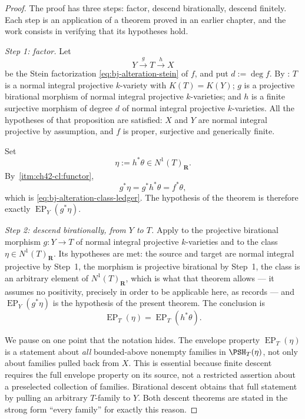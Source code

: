\begin{proof}
The proof has three steps: factor, descend birationally, descend finitely.
Each step is an application of a theorem proved in an earlier chapter, and
the work consists in verifying that its hypotheses hold.

\medskip
\noindent\emph{Step 1: factor.}
Let
\[
 Y\xrightarrow{\ g\ }T\xrightarrow{\ h\ }X
\]
be the Stein factorization \eqref{eq:bj-alteration-stein} of $f$, and put
$d:=\deg f$.  By :
$T$ is a normal integral projective $k$-variety with $K(T)=K(Y)$;
$g$ is a projective birational morphism of normal integral projective
$k$-varieties; and $h$ is a finite surjective morphism of degree $d$
of normal integral projective $k$-varieties.  All the hypotheses of that
proposition are satisfied: $X$ and $Y$ are normal integral projective by
assumption, and $f$ is proper, surjective and generically finite.

Set
\[
 \eta:=h^*\theta\in N^1(T)_{\mathbf R}.
\]
By \,\cref{itm:ch42-cl:functor},
\[
 g^*\eta=g^*h^*\theta=f^*\theta,
\]
which is \eqref{eq:bj-alteration-class-ledger}.  The hypothesis of the
theorem is therefore exactly $\operatorname{EP}_Y(g^*\eta)$.

\medskip
\noindent\emph{Step 2: descend birationally, from $Y$ to $T$.}
Apply  to the projective birational
morphism $g:Y\to T$ of normal integral projective $k$-varieties and to
the class $\eta\in N^1(T)_{\mathbf R}$.  Its hypotheses are met: the
source and target are normal integral projective by Step~1, the morphism is
projective birational by Step~1, the class is an arbitrary element of
$N^1(T)_{\mathbf R}$, which is what that theorem allows --- it assumes no
positivity, precisely in order to be applicable here, as
 records --- and
$\operatorname{EP}_Y(g^*\eta)$ is the hypothesis of the present theorem.
The conclusion is
\[
 \operatorname{EP}_T(\eta)=\operatorname{EP}_T(h^*\theta).
\]

We pause on one point that the notation hides.  The envelope property
$\operatorname{EP}_T(\eta)$ is a statement about \emph{all} bounded-above
nonempty families in $\PSH_T(\eta)$, not only about families pulled back
from $X$.  This is essential because finite descent requires the full
envelope property on its source, not a restricted assertion about a
preselected collection of families.  Birational descent obtains that full
statement by pulling an arbitrary $T$-family to $Y$.  Both descent theorems
are stated in the strong form ``every family'' for exactly this reason.


\end{proof}
